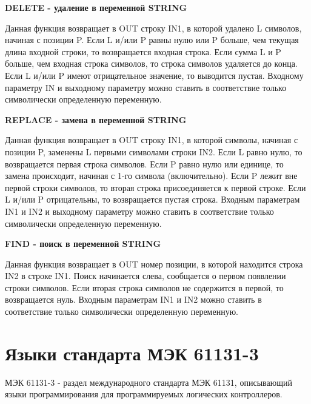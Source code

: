 \documentclass[letterpaper,10pt,russian]{sphinxmanual}
\begin{document}
\textbf{DELETE - удаление в переменной STRING}

Данная функция возвращает в OUT строку IN1, в которой удалено L
символов, начиная с позиции P. Если L и/или P равны нулю или P больше,
чем текущая длина входной строки, то возвращается входная строка. Если
сумма L и P больше, чем входная строка символов, то строка символов
удаляется до конца. Если L и/или P имеют отрицательное значение, то
выводится пустая. Входному параметру IN и выходному параметру можно
ставить в соответствие только символически определенную переменную.

\textbf{REPLACE - замена в переменной STRING}

Данная функция возвращает в OUT строку IN1, в которой символы, начиная с
позиции P, заменены L первыми символами строки IN2. Если L равно нулю,
то возвращается первая строка символов. Если P равно нулю или единице,
то замена происходит, начиная с 1-го символа (включительно). Если P
лежит вне первой строки символов, то вторая строка присоединяется к
первой строке. Если L и/или P отрицательны, то возвращается пустая
строка. Входным параметрам IN1 и IN2 и выходному параметру можно ставить
в соответствие только символически определенную переменную.

\textbf{FIND - поиск в переменной STRING}

Данная функция возвращает в OUT номер позиции, в которой находится
строка IN2 в строке IN1. Поиск начинается слева, сообщается о первом
появлении строки символов. Если вторая строка символов не содержится в
первой, то возвращается нуль. Входным параметрам IN1 и IN2 можно ставить
в соответствие только символически определенную переменную.


\section{Языки стандарта МЭК 61131-3}
\label{iec_guide/index::doc}\label{iec_guide/index:id1}
МЭК 61131-3 - раздел международного стандарта МЭК 61131, описывающий языки программирования для программируемых логических контроллеров.
\end{document}
